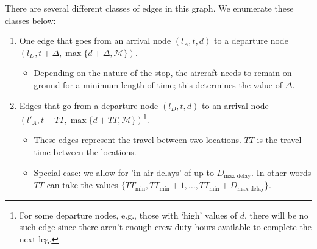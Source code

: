 There are several different classes of edges in this graph. We enumerate these classes below:

\begin{enumerate}
	\item One edge that goes from an arrival node $(l_A,t,d)$ to a departure node $(l_D,t+\Delta,\max\{d+\Delta,\mathcal{M}\})$.
		\begin{itemize}
			\item Depending on the nature of the stop, the aircraft needs to remain on ground for a minimum length of time; this determines the value of $\Delta$.
		\end{itemize}
	\item Edges that go from a departure node $(l_D,t,d)$ to an arrival node $(l'_A,t+TT,\max\{d+TT,\mathcal{M}\})$\footnote{For some departure nodes, e.g., those with `high' values of $d$, there will be no such edge since there aren't enough crew duty hours available to complete the next leg.}.
		\begin{itemize}
			\item These edges represent the travel between two locations. $TT$ is the travel time between the locations.
			\item Special case: we allow for 'in-air delays' of up to $D_\textrm{max delay}$. In other words $TT$ can take the values $\{TT_{\textrm{min}},TT_{\textrm{min}}+1,\dots,TT_{\textrm{min}}+D_\textrm{max delay}\}$.
		\end{itemize}
\end{enumerate}